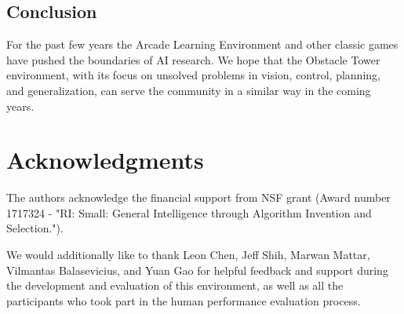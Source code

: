 \documentclass{article}
\begin{document}
\subsection{Conclusion}

For the past few years the Arcade Learning Environment and other classic games have pushed the boundaries of AI research. We hope that the Obstacle Tower environment, with its focus on unsolved problems in vision, control, planning, and generalization, can serve the community in a similar way in the coming years. 

\section*{Acknowledgments}
The authors acknowledge the financial support from NSF grant (Award number 1717324 - "RI: Small: General Intelligence through Algorithm Invention and Selection."). 

We would additionally like to thank Leon Chen, Jeff Shih, Marwan Mattar, Vilmantas Balasevicius, and Yuan Gao for helpful feedback and support during the development and evaluation of this environment, as well as all the participants who took part in the human performance evaluation process.



\end{document}
